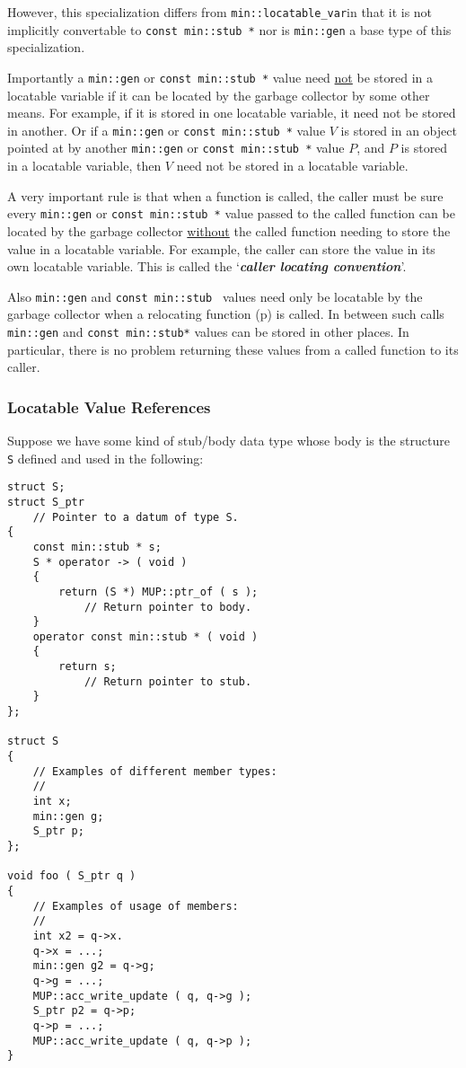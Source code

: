 \documentclass[12pt]{article}
\newcommand{\key}[1]{{\bf \em #1}\index{#1}}
\newcommand{\pagref}[1]{p\pageref{#1}}
\newcommand{\EOL}{\penalty \exhyphenpenalty}
\newenvironment{indpar}[1][0.3in]%
	{\begin{list}{}%
		     {\setlength{\itemsep}{0in}%
		      \setlength{\topsep}{0in}%
		      \setlength{\parsep}{1ex}%
		      \setlength{\labelwidth}{#1}%
		      \setlength{\leftmargin}{#1}%
		      \addtolength{\leftmargin}{\labelsep}}%
	 \item}%
	{\end{list}}
\begin{document}
However, this specialization differs from
{\tt min::\EOL locatable\_\EOL var\TARG}in that it is not
implicitly convertable to {\tt const min::\EOL stub~*} nor
is {\tt min::gen} a base type of this specialization.

Importantly a \verb|min::gen| or \verb|const min::stub *|
value need \underline{not} be stored
in a locatable variable if it can be located by the garbage collector by some
other means.  For example, if it is stored in one locatable variable,
it need not be stored in another.  Or if a \verb|min::gen|
or {\tt const min::\EOL stub~*} value
$V$ is stored in an object pointed at by another \verb|min::gen|
or {\tt const min::\EOL stub~*}
value $P$, and $P$ is stored in a locatable variable, then $V$ need not
be stored in a locatable variable.

A very important rule is that when a function is called, the caller
must be sure every \verb|min::gen|
or {\tt const min::\EOL stub~*} value passed to the called
function can be located by the garbage collector \underline{without} the called
function needing to store the value in a locatable variable.
For example, the caller can store the value in its own locatable
variable.  This is called the `\key{caller locating convention}'.

Also \verb|min::gen| and {\tt const min::\EOL stub~}
values need only be locatable by
the garbage collector when a relocating function (\pagref{RELOCATING-FUNCTIONS})
is called.  In between such calls \verb|min::gen|
and {\tt const min::\EOL stub*} values can be
stored in other places.  In particular, there is no problem
returning these values from a called function to its caller.

\subsubsection{Locatable Value References}
\label{LOCATABLE-VALUE-REFERENCES}

Suppose we have some kind of stub/body data type whose body
is the structure {\tt S} defined and used in the following:

\begin{indpar}\begin{verbatim}
struct S;
struct S_ptr
    // Pointer to a datum of type S.
{
    const min::stub * s;
    S * operator -> ( void )
    {
        return (S *) MUP::ptr_of ( s );
            // Return pointer to body.
    }
    operator const min::stub * ( void )
    {
        return s;
            // Return pointer to stub.
    }
};

struct S
{
    // Examples of different member types:
    //
    int x;
    min::gen g;
    S_ptr p;
};

void foo ( S_ptr q )
{
    // Examples of usage of members:
    //
    int x2 = q->x.
    q->x = ...;
    min::gen g2 = q->g;
    q->g = ...;
    MUP::acc_write_update ( q, q->g );
    S_ptr p2 = q->p;
    q->p = ...;
    MUP::acc_write_update ( q, q->p );
}
\end{verbatim}\end{indpar}
\end{document}
